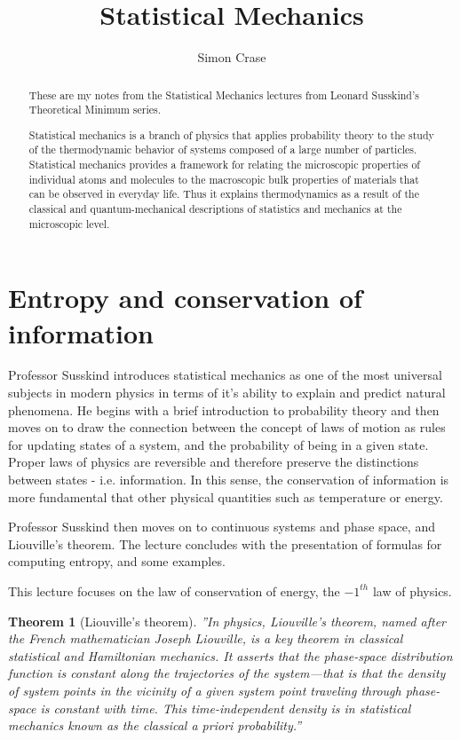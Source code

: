 \documentclass[]{article}
\title{Statistical Mechanics}
\author{Simon Crase}
\newtheorem{thm}{Theorem}
\begin{document}
\maketitle

\begin{abstract}
These are my notes from the Statistical Mechanics lectures from Leonard Susskind's Theoretical Minimum series.

Statistical mechanics is a branch of physics that applies probability theory to the study of the thermodynamic behavior of systems composed of a large number of particles. Statistical mechanics provides a framework for relating the microscopic properties of individual atoms and molecules to the macroscopic bulk properties of materials that can be observed in everyday life. Thus it explains thermodynamics as a result of the classical and quantum-mechanical descriptions of statistics and mechanics at the microscopic level.
\end{abstract}

\tableofcontents

\listoffigures


\section{Entropy and conservation of information}

Professor Susskind introduces statistical mechanics as one of the most universal subjects in modern physics in terms of it's ability to explain and predict natural phenomena.  He begins with a brief introduction to probability theory and then moves on to draw the connection between the concept of laws of motion as rules for updating states of a system, and the probability of being in a given state.  Proper laws of physics are reversible and therefore preserve the distinctions between states - i.e. information.  In this sense, the conservation of information is more fundamental that other physical quantities such as temperature or energy.

Professor Susskind then moves on to continuous systems and phase space, and Liouville's theorem.  The lecture concludes with the presentation of formulas for computing entropy, and some examples.

This lecture focuses on the law of conservation of energy, the $-1^{th}$ law of physics. 

\begin{thm}[Liouville's theorem]
	''In physics, Liouville's theorem, named after the French mathematician Joseph Liouville, is a key theorem in classical statistical and Hamiltonian mechanics. It asserts that the phase-space distribution function is constant along the trajectories of the system—that is that the density of system points in the vicinity of a given system point traveling through phase-space is constant with time. This time-independent density is in statistical mechanics known as the classical a priori probability.''
\end{thm}
\end{document}

